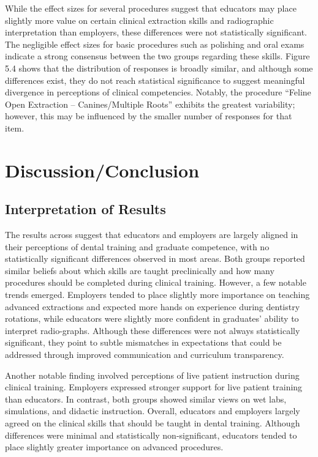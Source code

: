 \documentclass[
  12pt,
  letterpaper,
  DIV=11,
  numbers=noendperiod]{scrartcl}
\numberwithin{figure}{section}
\numberwithin{table}{section}
\begin{document}
While the effect sizes for several procedures suggest that educators may
place slightly more value on certain clinical extraction skills and
radiographic interpretation than employers, these differences were not
statistically significant. The negligible effect sizes for basic
procedures such as polishing and oral exams indicate a strong consensus
between the two groups regarding these skills. Figure 5.4 shows that the
distribution of responses is broadly similar, and although some
differences exist, they do not reach statistical significance to suggest
meaningful divergence in perceptions of clinical competencies. Notably,
the procedure ``Feline Open Extraction -- Canines/Multiple Roots''
exhibits the greatest variability; however, this may be influenced by
the smaller number of responses for that item.

\section{Discussion/Conclusion}\label{discussionconclusion}

\subsection{Interpretation of Results}\label{interpretation-of-results}

The results across suggest that educators and employers are largely
aligned in their perceptions of dental training and graduate competence,
with no statistically significant differences observed in most areas.
Both groups reported similar beliefs about which skills are taught
preclinically and how many procedures should be completed during
clinical training. However, a few notable trends emerged. Employers
tended to place slightly more importance on teaching advanced
extractions and expected more hands on experience during dentistry
rotations, while educators were slightly more confident in graduates'
ability to interpret radio-graphs. Although these differences were not
always statistically significant, they point to subtle mismatches in
expectations that could be addressed through improved communication and
curriculum transparency.

Another notable finding involved perceptions of live patient instruction
during clinical training. Employers expressed stronger support for live
patient training than educators. In contrast, both groups showed similar
views on wet labs, simulations, and didactic instruction. Overall,
educators and employers largely agreed on the clinical skills that
should be taught in dental training. Although differences were minimal
and statistically non-significant, educators tended to place slightly
greater importance on advanced procedures.
\end{document}
